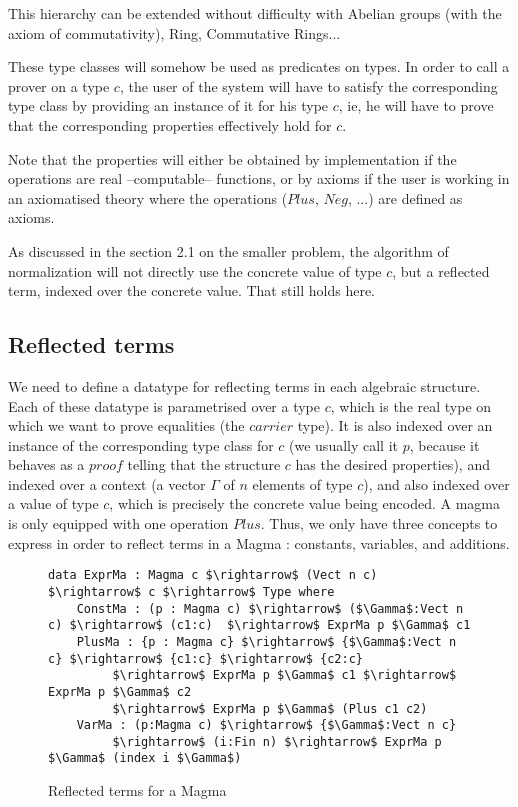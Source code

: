 This hierarchy can be extended without difficulty with Abelian groups (with the axiom of commutativity), Ring, Commutative Rings...

These type classes will somehow be used as predicates on types. In order to call a prover on a type $c$, the user of the system will have to satisfy the corresponding type class by providing an instance of it for his type $c$, ie, he will have to prove that the corresponding properties effectively hold for $c$.

Note that the properties will either be obtained by implementation if the operations are real --computable-- functions, or by axioms if the user is working in an axiomatised theory where the operations ($Plus$, $Neg$, ...) are defined as axioms.

As discussed in the section 2.1 on the smaller problem, the algorithm of normalization will not directly use the concrete value of type $c$, but a reflected term, indexed over the concrete value. That still holds here.


	\subsection {Reflected terms}

We need to define a datatype for reflecting terms in each algebraic structure.
Each of these datatype is parametrised over a type $c$, which is the real type on which we want to prove equalities (the $carrier$ type). It is also indexed over an instance of the corresponding type class for $c$ (we usually call it $p$, because it behaves as a $proof$ telling that the structure $c$ has the desired properties), and indexed over a context (a vector $\Gamma$ of $n$ elements of type $c$), and also indexed over a value of type $c$, which is precisely the concrete value being encoded.
A magma is only equipped with one operation $Plus$. Thus, we only have three concepts to express in order to reflect terms in a Magma : constants, variables, and additions.



\begin{figure}[H]
\figrule
\begin{center}
\begin{lstlisting}
data ExprMa : Magma c $\rightarrow$ (Vect n c) $\rightarrow$ c $\rightarrow$ Type where
    ConstMa : (p : Magma c) $\rightarrow$ ($\Gamma$:Vect n c) $\rightarrow$ (c1:c)  $\rightarrow$ ExprMa p $\Gamma$ c1 
    PlusMa : {p : Magma c} $\rightarrow$ {$\Gamma$:Vect n c} $\rightarrow$ {c1:c} $\rightarrow$ {c2:c} 
         $\rightarrow$ ExprMa p $\Gamma$ c1 $\rightarrow$ ExprMa p $\Gamma$ c2 
         $\rightarrow$ ExprMa p $\Gamma$ (Plus c1 c2) 
    VarMa : (p:Magma c) $\rightarrow$ {$\Gamma$:Vect n c}
         $\rightarrow$ (i:Fin n) $\rightarrow$ ExprMa p $\Gamma$ (index i $\Gamma$)
\end{lstlisting}
\end{center}
\caption{Reflected terms for a Magma}
\label{ExprMa}
\figrule
\end{figure}

